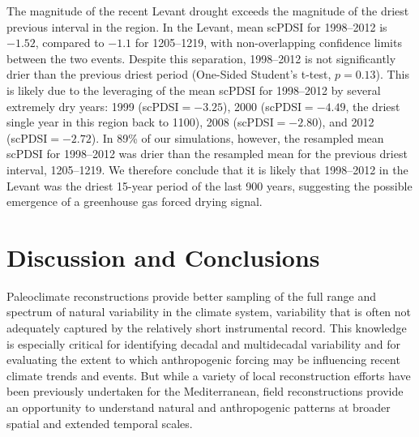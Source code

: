 \documentclass[draft,jgr]{AGUTeX}
\begin{document}
\begin{article}
\indent The magnitude of the recent Levant drought exceeds the magnitude of the driest previous interval in the region. In the Levant, mean scPDSI for 1998--2012 is $-1.52$, compared to $-1.1$ for 1205--1219, with non-overlapping confidence limits between the two events. Despite this separation, 1998--2012 is not significantly drier than the previous driest period (One-Sided Student's t-test, $p=0.13$). This is likely due to the leveraging of the mean scPDSI for 1998--2012 by several extremely dry years: 1999 (scPDSI$=-3.25$), 2000 (scPDSI$=-4.49$, the driest single year in this region back to 1100), 2008 (scPDSI$=-2.80$), and 2012 (scPDSI$=-2.72$). In 89\% of our simulations, however, the resampled mean scPDSI for 1998--2012 was drier than the resampled mean for the previous driest interval, 1205--1219. We therefore conclude that it is likely that 1998--2012 in the Levant was the driest 15-year period of the last 900 years, suggesting the possible emergence of a greenhouse gas forced drying signal.

\section{Discussion and Conclusions}
\noindent Paleoclimate reconstructions provide better sampling of the full range and spectrum of natural variability in the climate system, variability that is often not adequately captured by the relatively short instrumental record. This knowledge is especially critical for identifying decadal and multidecadal variability and for evaluating the extent to which anthropogenic forcing may be influencing recent climate trends and events. But while a variety of local reconstruction efforts have been previously undertaken for the Mediterranean, field reconstructions provide an opportunity to understand natural and anthropogenic patterns at broader spatial and extended temporal scales.


\end{article}
\end{document}
